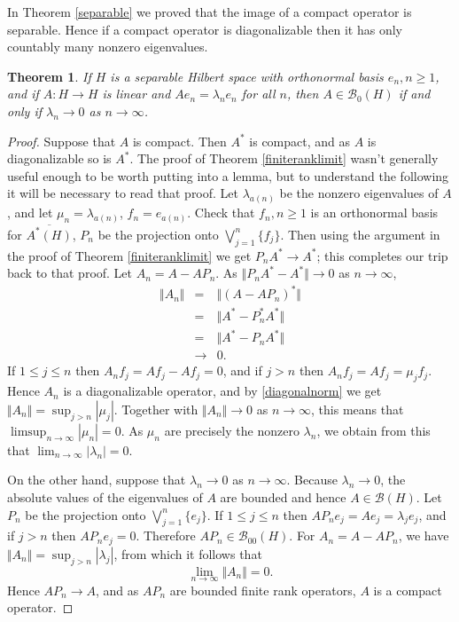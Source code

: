 \documentclass{article}
\newcommand{\norm}[1]{\Vert #1 \Vert}
\newtheorem{theorem}{Theorem}
\begin{document}
In Theorem \ref{separable} we proved that the image of a compact operator is separable. Hence if a compact operator is diagonalizable then it has only countably many nonzero eigenvalues.

\begin{theorem}
If $H$ is a separable Hilbert space with orthonormal basis $e_n, n \geq 1$, and if $A:H \to H$ is linear and
$Ae_n=\lambda_n e_n$ for all $n$,
then $A \in \mathscr{B}_0(H)$ if and only if $\lambda_n \to 0$ as $n \to \infty$.
\end{theorem}
\begin{proof}
Suppose that $A$ is compact. Then $A^*$ is compact, and as $A$ is diagonalizable so is $A^*$. The proof of Theorem \ref{finiteranklimit} wasn't generally useful enough to be worth putting
into a lemma, but to understand the following it will be necessary to read that proof.
Let $\lambda_{a(n)}$ be the nonzero eigenvalues of $A$, and let $\mu_n=\lambda_{a(n)}$, $f_n=e_{a(n)}$. Check that $f_n, n \geq 1$ is an orthonormal basis for $\overline{A^*(H)}$,
 $P_n$ be the projection onto $\bigvee_{j=1}^n \{f_j\}$.
 Then using the argument in the proof of Theorem \ref{finiteranklimit} we get $P_n A^* \to A^*$; this completes our trip back to that proof.  
Let $A_n = A-AP_n$. As $\norm{P_nA^*-A^*} \to 0$ as $n \to \infty$,
\begin{eqnarray*}
\norm{A_n}&=&\norm{(A-AP_n)^*}\\
&=&\norm{A^*-P_n^*A^*}\\
&=&\norm{A^*-P_n A^*}\\
&\to&0.
\end{eqnarray*}
If $1 \leq j \leq n$ then $A_n f_j = Af_j-Af_j = 0$, and if $j > n$ then
$A_n f_j = Af_j=\mu_j f_j$. Hence $A_n$ is a diagonalizable operator, and by \eqref{diagonalnorm} we get $\norm{A_n}=\sup_{j>n} |\mu_j|$. 
Together with $\norm{A_n} \to 0$ as $n \to \infty$, this means that $\limsup_{n \to \infty} |\mu_n| = 0$. As $\mu_n$ are precisely the nonzero $\lambda_n$, we obtain from this
that
$\lim_{n \to \infty} |\lambda_n|=0$.

On the other hand, suppose that $\lambda_n \to 0$ as $n \to \infty$.
Because $\lambda_n \to 0$, the absolute values of the eigenvalues of $A$ are bounded and hence 
$A \in \mathscr{B}(H)$. 
Let $P_n$ be the projection onto
$\bigvee_{j=1}^n \{e_j\}$. If $1 \leq j \leq n$ then $AP_n e_j =Ae_j=\lambda_j e_j$, and if
$j>n$ then $AP_n e_j = 0$. Therefore $AP_n \in \mathscr{B}_{00}(H)$. For $A_n=A-AP_n$, we have
$\norm{A_n} = \sup_{j>n} |\lambda_j|$, from which it follows that
\[
\lim_{n \to \infty} \norm{A_n} =0.
\]
Hence $AP_n \to A$, and as $AP_n$ are bounded finite rank operators, $A$ is a compact operator.
\end{proof}
\end{document}
